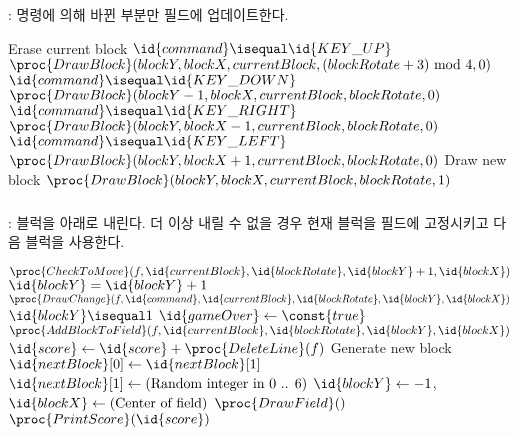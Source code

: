 \subsubsection{}: 명령에 의해 바뀐 부분만 필드에 업데이트한다.

\begin{codebox}
\li \Comment Erase current block
\li \If $\id{command} \isequal \id{KEY\_UP}$
\li \Then $\proc{DrawBlock}(blockY, blockX, currentBlock, (blockRotate+3) \mbox{ mod } 4, 0)$ \End
\li \If $\id{command} \isequal \id{KEY\_DOWN}$
\li \Then $\proc{DrawBlock}(blockY - 1, blockX, currentBlock, blockRotate, 0)$ \End
\li \If $\id{command} \isequal \id{KEY\_RIGHT}$
\li \Then $\proc{DrawBlock}(blockY, blockX - 1, currentBlock, blockRotate, 0)$ \End
\li \If $\id{command} \isequal \id{KEY\_LEFT}$
\li \Then $\proc{DrawBlock}(blockY, blockX + 1, currentBlock, blockRotate, 0)$ \End
\li \Comment Draw new block
\li $\proc{DrawBlock}(blockY, blockX, currentBlock, blockRotate, 1)$
\end{codebox}

\newpage

\subsubsection{}: 블럭을 아래로 내린다. 더 이상 내릴 수 없을 경우 현재 블럭을 필드에 고정시키고 다음 블럭을 사용한다.

\begin{codebox}
\li \If $\proc{CheckToMove}(f, \id{currentBlock}, \id{blockRotate}, \id{blockY} + 1, \id{blockX})$
\li \Then
        $\id{blockY} = \id{blockY} + 1$
\li     $\proc{DrawChange}(f, \id{command}, \id{currentBlock}, \id{blockRotate}, \id{blockY}, \id{blockX})$
\li \Else
\li     \If $\id{blockY} \isequal 1$
\li     \Then
            $\id{gameOver} \gets \const{true}$
\li     \Else
\li         $\proc{AddBlockToField}(f, \id{currentBlock}, \id{blockRotate}, \id{blockY}, \id{blockX})$
\li         $\id{score} \gets \id{score} + \proc{DeleteLine}(f)$
\li         \Comment Generate new block
\li         $\id{nextBlock}[0] \gets \id{nextBlock}[1]$
\li         $\id{nextBlock}[1] \gets (\mbox{Random integer in 0 .. 6})$
\li         $\id{blockY} \gets -1$, $\id{blockX} \gets (\mbox{Center of field})$
\li         $\proc{DrawField}()$
\li         $\proc{PrintScore}(\id{score})$
        \End
    \End
\end{codebox}

